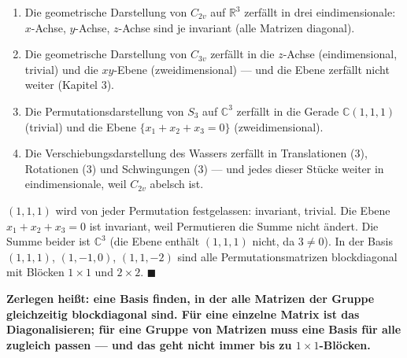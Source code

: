 \begin{merksatz}
\begin{enumerate}[label=(\alph*), leftmargin=1.6em]
\item Die geometrische Darstellung von $C_{2v}$ auf $\mathbb R^{3}$ zerfällt in drei eindimensionale: $x$-Achse, $y$-Achse, $z$-Achse sind je invariant (alle Matrizen diagonal).
\item Die geometrische Darstellung von $C_{3v}$ zerfällt in die $z$-Achse (eindimensional, trivial) und die $xy$-Ebene (zweidimensional) --- und die Ebene zerfällt nicht weiter (Kapitel 3).
\item Die Permutationsdarstellung von $S_3$ auf $\mathbb C^{3}$ zerfällt in die Gerade $\mathbb C(1, 1, 1)$ (trivial) und die Ebene $\{x_1 + x_2 + x_3 = 0\}$ (zweidimensional).
\item Die Verschiebungsdarstellung des Wassers zerfällt in Translationen ($3$), Rotationen ($3$) und Schwingungen ($3$) --- und jedes dieser Stücke weiter in eindimensionale, weil $C_{2v}$ abelsch ist.
\end{enumerate}

$(1, 1, 1)$ wird von jeder Permutation festgelassen: invariant, trivial. Die Ebene $x_1 + x_2 + x_3 = 0$ ist invariant, weil Permutieren die Summe nicht ändert. Die Summe beider ist $\mathbb C^{3}$ (die Ebene enthält $(1,1,1)$ nicht, da $3\ne0$). In der Basis $(1,1,1)$, $(1,-1,0)$, $(1,1,-2)$ sind alle Permutationsmatrizen blockdiagonal mit Blöcken $1\times1$ und $2\times2$. $\blacksquare$

\begin{center}
\begin{minipage}{0.9\textwidth}
\textbf{Zerlegen heißt: eine Basis finden, in der alle Matrizen der Gruppe gleichzeitig blockdiagonal sind. Für eine einzelne Matrix ist das Diagonalisieren; für eine Gruppe von Matrizen muss eine Basis für alle zugleich passen --- und das geht nicht immer bis zu $1\times1$-Blöcken.}
\end{minipage}
\end{center}

\begin{center}
\begin{minipage}{0.88\textwidth}
\end{minipage}
\end{center}
\end{merksatz}

